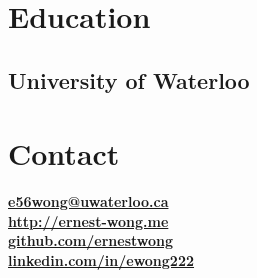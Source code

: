\documentclass[]{deedy-resume}
\begin{document}
\begin{minipage}[t]{0.33\textwidth}

\section{Education}

\subsection{University of Waterloo}

\sectionsep


\section{Contact}
\href{e56wong@uwaterloo.ca}{\bf e56wong@uwaterloo.ca} \\
\href{http://ernest-wong.me}{\bf http://ernest-wong.me} \\
\href{https://github.com/ernestwong}{\bf github.com/ernestwong} \\
\href{https://www.linkedin.com/in/ewong222}{\bf linkedin.com/in/ewong222} \\
\sectionsep





%
%

\end{minipage}
\end{document}
